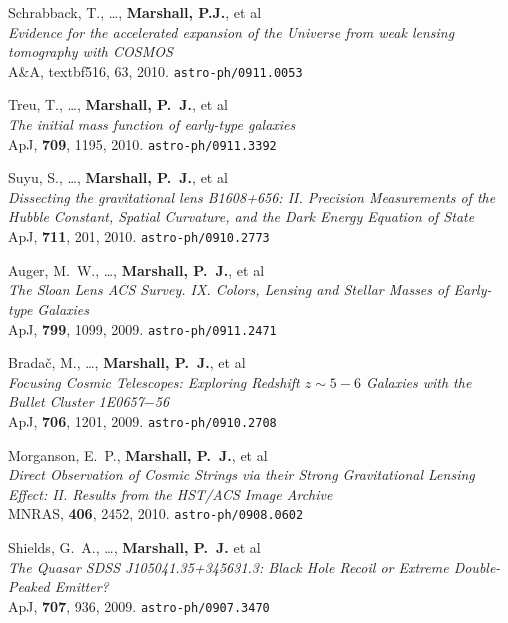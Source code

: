 \begin{revnumerate}
\item{Schrabback, T., \ldots, \textbf{Marshall, P.J.}, et al\\
\textit{Evidence for the accelerated expansion of the Universe from weak
lensing tomography with COSMOS}\\
A\&A, textbf{516}, 63, 2010.
\texttt{astro-ph/0911.0053}
}

\item{Treu, T., \dots, \textbf{Marshall, P.~J.}, et al\\
\textit{The initial mass function of early-type galaxies}\\
ApJ, \textbf{709}, 1195, 2010.
\texttt{astro-ph/0911.3392}
}

\item{Suyu, S., \ldots, \textbf{{Marshall}, P.~J.}, et al\\
\textit{Dissecting the gravitational lens B1608+656:
II. Precision Measurements of the Hubble Constant, Spatial Curvature, and the
Dark Energy Equation of State}\\
ApJ, \textbf{711}, 201, 2010.
\texttt{astro-ph/0910.2773}
}

\item{Auger, M.~W., \ldots, \textbf{{Marshall}, P.~J.}, et al\\
\textit{ The Sloan Lens ACS Survey. IX. Colors, Lensing and Stellar Masses
of Early-type Galaxies}\\
ApJ, \textbf{799}, 1099, 2009.
\texttt{astro-ph/0911.2471}
}

\item{Brada\v{c}, M., \ldots, \textbf{{Marshall}, P.~J.}, et al\\
\textit{Focusing Cosmic Telescopes: Exploring Redshift $z\sim 5-6$
Galaxies with the Bullet Cluster 1E0657$-$56}\\
ApJ, \textbf{706}, 1201, 2009.
\texttt{astro-ph/0910.2708}
}

\item{Morganson, E.~P., \textbf{{Marshall}, P.~J.}, et al\\
\textit{Direct Observation of Cosmic Strings via their Strong
Gravitational Lensing Effect: II. Results from the HST/ACS Image
Archive}\\
MNRAS, \textbf{406}, 2452, 2010.
\texttt{astro-ph/0908.0602}
}

\item{{Shields}, G.~A., \dots, \textbf{{Marshall}, P.~J.} et al\\
\textit{The Quasar SDSS J105041.35+345631.3: Black Hole Recoil or Extreme Double-Peaked Emitter?}\\
ApJ, \textbf{707}, 936, 2009.
\texttt{astro-ph/0907.3470}
}


\end{revnumerate}
